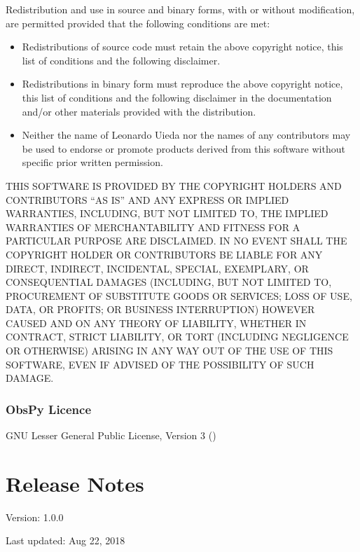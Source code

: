 \documentclass[a4paper,10pt,english]{sphinxmanual}
\begin{document}
Redistribution and use in source and binary forms, with or without modification,
are permitted provided that the following conditions are met:
\begin{itemize}
\item {} 
Redistributions of source code must retain the above copyright notice,
this list of conditions and the following disclaimer.

\item {} 
Redistributions in binary form must reproduce the above copyright notice,
this list of conditions and the following disclaimer in the documentation
and/or other materials provided with the distribution.

\item {} 
Neither the name of Leonardo Uieda nor the names of any contributors
may be used to endorse or promote products derived from this software
without specific prior written permission.

\end{itemize}

THIS SOFTWARE IS PROVIDED BY THE COPYRIGHT HOLDERS AND CONTRIBUTORS “AS IS” AND
ANY EXPRESS OR IMPLIED WARRANTIES, INCLUDING, BUT NOT LIMITED TO, THE IMPLIED
WARRANTIES OF MERCHANTABILITY AND FITNESS FOR A PARTICULAR PURPOSE ARE
DISCLAIMED. IN NO EVENT SHALL THE COPYRIGHT HOLDER OR CONTRIBUTORS BE LIABLE FOR
ANY DIRECT, INDIRECT, INCIDENTAL, SPECIAL, EXEMPLARY, OR CONSEQUENTIAL DAMAGES
(INCLUDING, BUT NOT LIMITED TO, PROCUREMENT OF SUBSTITUTE GOODS OR SERVICES;
LOSS OF USE, DATA, OR PROFITS; OR BUSINESS INTERRUPTION) HOWEVER CAUSED AND ON
ANY THEORY OF LIABILITY, WHETHER IN CONTRACT, STRICT LIABILITY, OR TORT
(INCLUDING NEGLIGENCE OR OTHERWISE) ARISING IN ANY WAY OUT OF THE USE OF THIS
SOFTWARE, EVEN IF ADVISED OF THE POSSIBILITY OF SUCH DAMAGE.


\subsection{ObsPy Licence}
\label{\detokenize{licence:obspy-licence}}
GNU Lesser General Public License, Version 3 ()


\chapter{Release Notes}
\label{\detokenize{gmg_documentation:release-notes}}
Version: 1.0.0

Last updated: Aug 22, 2018
\end{document}
